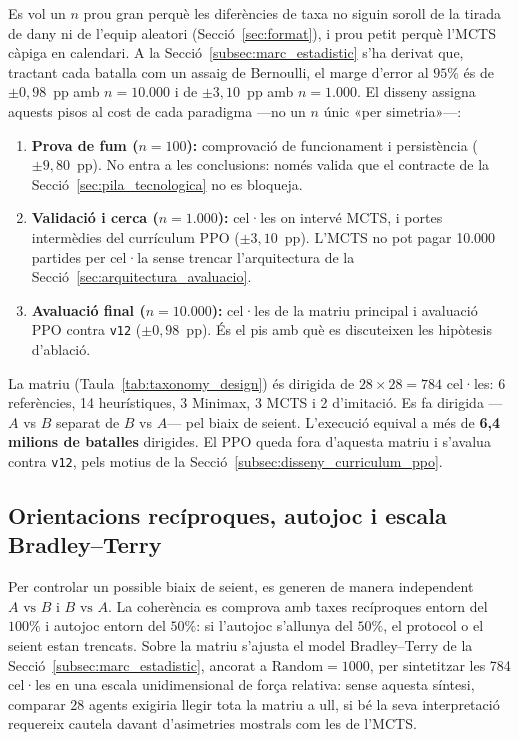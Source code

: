 Es vol un $n$ prou gran perquè les diferències de taxa no siguin soroll de la tirada de dany ni de l'equip aleatori (Secció~\ref{sec:format}), i prou petit perquè l'MCTS càpiga en calendari. A la Secció~\ref{subsec:marc_estadistic} s'ha derivat que, tractant cada batalla com un assaig de Bernoulli, el marge d'error al $95\%$ és de $\pm 0{,}98$~pp amb $n=10.000$ i de $\pm 3{,}10$~pp amb $n=1.000$. El disseny assigna aquests pisos al cost de cada paradigma ---no un $n$ únic «per simetria»---:

\begin{enumerate}
    \item \textbf{Prova de fum ($n=100$):} comprovació de funcionament i persistència ($\pm 9{,}80$~pp). No entra a les conclusions: només valida que el contracte de la Secció~\ref{sec:pila_tecnologica} no es bloqueja.
    \item \textbf{Validació i cerca ($n=1.000$):} cel·les on intervé MCTS, i portes intermèdies del currículum PPO ($\pm 3{,}10$~pp). L'MCTS no pot pagar 10.000 partides per cel·la sense trencar l'arquitectura de la Secció~\ref{sec:arquitectura_avaluacio}.
    \item \textbf{Avaluació final ($n=10.000$):} cel·les de la matriu principal i avaluació PPO contra \texttt{v12} ($\pm 0{,}98$~pp). És el pis amb què es discuteixen les hipòtesis d'ablació.
\end{enumerate}




La matriu (Taula~\ref{tab:taxonomy_design}) és dirigida de $28 \times 28 = 784$ cel·les: 6 referències, 14 heurístiques, 3 Minimax, 3 MCTS i 2 d'imitació. Es fa dirigida ---$A$ vs $B$ separat de $B$ vs $A$--- pel biaix de seient. L'execució equival a més de \textbf{6,4 milions de batalles} dirigides. El PPO queda fora d'aquesta matriu i s'avalua contra \texttt{v12}, pels motius de la Secció~\ref{subsec:disseny_curriculum_ppo}.

\subsection{Orientacions recíproques, autojoc i escala Bradley--Terry}

Per controlar un possible biaix de seient, es generen de manera independent $A \text{ vs } B$ i $B \text{ vs } A$. La coherència es comprova amb taxes recíproques entorn del $100\%$ i autojoc entorn del $50\%$: si l'autojoc s'allunya del $50\%$, el protocol o el seient estan trencats. Sobre la matriu s'ajusta el model Bradley--Terry de la Secció~\ref{subsec:marc_estadistic}, ancorat a $\text{Random} = 1000$, per sintetitzar les 784 cel·les en una escala unidimensional de força relativa: sense aquesta síntesi, comparar 28 agents exigiria llegir tota la matriu a ull, si bé la seva interpretació requereix cautela davant d'asimetries mostrals com les de l'MCTS.

